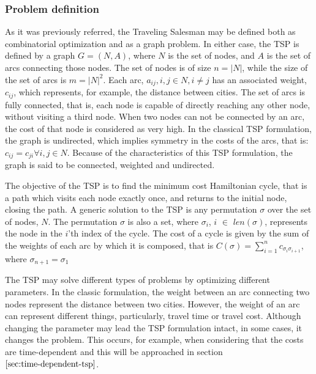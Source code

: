\subsubsection{Problem definition}
\label{sec:classic_tsp}

As it was previously referred, the Traveling Salesman may be defined both as combinatorial optimization and as a graph problem. In either case, the TSP is defined by a graph $G = (N, A)$, where $N$ is the set of nodes, and $A$ is the set of arcs connecting those nodes. The set of nodes is of size $n = |N|$, while the size of the set of arcs is $m = |N|^2$. Each arc, $a_{ij}, i, j \in N, i \ne j$ has an associated weight, $c_{ij}$, which represents, for example, the distance between cities. The set of arcs is fully connected, that is, each node is capable of directly reaching any other node, without visiting a third node. When two nodes can not be connected by an arc, the cost of that node is considered as very high. In the classical TSP formulation, the graph is undirected, which implies symmetry in the costs of the arcs, that is: $c_{ij} = c_{ji} \forall i, j \in N$. Because of the characteristics of this TSP formulation, the graph is said to be connected, weighted and undirected.

The objective of the TSP is to find the minimum cost Hamiltonian cycle, that is a path which visits each node exactly once, and returns to the initial node, closing the path. A generic solution to the TSP is any permutation $\sigma$ over the set of nodes, $N$. The permutation $\sigma$ is also a set, where $\sigma_{i}$, $i$ $\in$ $len(\sigma)$, represents the node in the $i$'th index of the cycle. The cost of a cycle is given by the sum of the weights of each arc by which it is composed, that is $C(\sigma) = \sum_{i=1}^{n} c_{\sigma_{i} \sigma_{i+1}}$, where $\sigma_{n+1} = \sigma_{1}$

The TSP may solve different types of problems by optimizing different parameters. In the classic formulation, the weight between an arc connecting two nodes represent the distance between two cities. However, the weight of an arc can represent different things, particularly, travel time or travel cost. Although changing the parameter may lead the TSP formulation intact, in some cases, it changes the problem. This occurs, for example, when considering that the costs are time-dependent and this will be approached in section $\ref{sec:time-dependent-tsp}$.